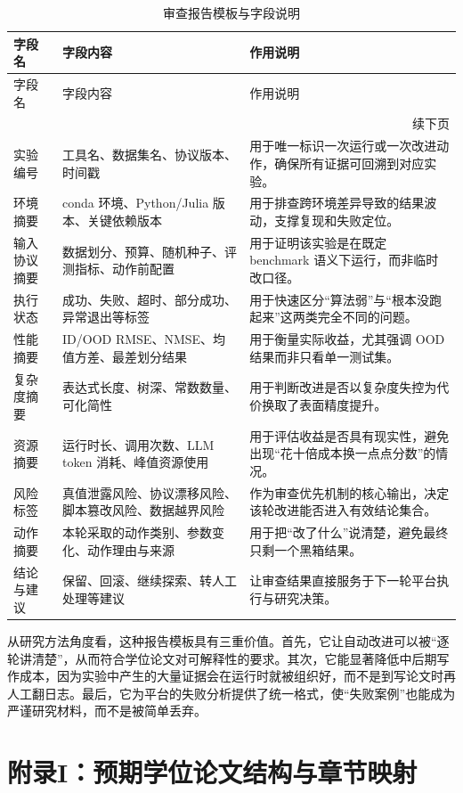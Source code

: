 \documentclass[UTF8,12pt]{ctexart}
\begin{document}
\small
\begin{longtable}{p{3.0cm}p{4.0cm}p{5.2cm}}
\caption{审查报告模板与字段说明}\label{tab:audit-template}\\
\toprule
字段名 & 字段内容 & 作用说明 \\
\midrule
\endfirsthead
\toprule
字段名 & 字段内容 & 作用说明 \\
\midrule
\endhead
\midrule
\multicolumn{3}{r}{续下页}\\
\endfoot
\bottomrule
\endlastfoot
实验编号 & 工具名、数据集名、协议版本、时间戳 & 用于唯一标识一次运行或一次改进动作，确保所有证据可回溯到对应实验。 \\
环境摘要 & conda 环境、Python/Julia 版本、关键依赖版本 & 用于排查跨环境差异导致的结果波动，支撑复现和失败定位。 \\
输入协议摘要 & 数据划分、预算、随机种子、评测指标、动作前配置 & 用于证明该实验是在既定 benchmark 语义下运行，而非临时改口径。 \\
执行状态 & 成功、失败、超时、部分成功、异常退出等标签 & 用于快速区分“算法弱”与“根本没跑起来”这两类完全不同的问题。 \\
性能摘要 & ID/OOD RMSE、NMSE、均值方差、最差划分结果 & 用于衡量实际收益，尤其强调 OOD 结果而非只看单一测试集。 \\
复杂度摘要 & 表达式长度、树深、常数数量、可化简性 & 用于判断改进是否以复杂度失控为代价换取了表面精度提升。 \\
资源摘要 & 运行时长、调用次数、LLM token 消耗、峰值资源使用 & 用于评估收益是否具有现实性，避免出现“花十倍成本换一点点分数”的情况。 \\
风险标签 & 真值泄露风险、协议漂移风险、脚本篡改风险、数据越界风险 & 作为审查优先机制的核心输出，决定该轮改进能否进入有效结论集合。 \\
动作摘要 & 本轮采取的动作类别、参数变化、动作理由与来源 & 用于把“改了什么”说清楚，避免最终只剩一个黑箱结果。 \\
结论与建议 & 保留、回滚、继续探索、转人工处理等建议 & 让审查结果直接服务于下一轮平台执行与研究决策。 \\
\end{longtable}
\normalsize

从研究方法角度看，这种报告模板具有三重价值。首先，它让自动改进可以被“逐轮讲清楚”，从而符合学位论文对可解释性的要求。其次，它能显著降低中后期写作成本，因为实验中产生的大量证据会在运行时就被组织好，而不是到写论文时再人工翻日志。最后，它为平台的失败分析提供了统一格式，使“失败案例”也能成为严谨研究材料，而不是被简单丢弃。

\section{附录I：预期学位论文结构与章节映射}
\end{document}
